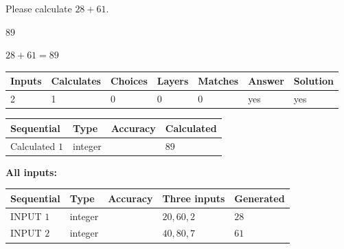 \documentclass[12pt]{article}
\begin{document}
  
 
Please calculate $ %
28 +  %
61 $.
 
 
 
\noindent{}
 
 

89
 
 
\noindent{}
 
 

 
 
 
\noindent{}
 
 

$ %
28 +  %
61=   %
89$
 
 
\noindent{}
 
 

 
   
   
   
   
\noindent\begin{tabular}{|l|l|l|l|l|l|l|}
 \hline
Inputs & Calculates & Choices & Layers & Matches & Answer & Solution \\ \hline
 2  & 
 1  & 
 0
  & 
 0  & 
 0  & 
  yes & 
  yes 
  \\ \hline
 \end{tabular}
   
   
   
   
\noindent{}
   
   
  
  
\noindent\begin{tabular}{|l|l|l|l|}
\hline
 Sequential & Type & Accuracy & Calculated \\ 
\hline
 
 
  Calculated $  1 $ & integer &  & 
  $ 89 $ 
 \\  \hline  
 \end{tabular}
   
   
   
   
\noindent\vspace{0.1in}\hspace{-0.08in} {\textbf{\Large{All inputs: }}}
   
   
  
  
\noindent\begin{tabular}{|l|l|l|l|l|}
\hline
 Sequential & Type & Accuracy & Three inputs & Generated \\ 
\hline
 
 
  INPUT $  1 $ & integer &  & $
 20
 , 
 60
 , 
 2
 $ & $ 28 $ 
 \\  \hline  
 
 
  INPUT $  2 $ & integer &  & $
 40
 , 
 80
 , 
 7
 $ & $ 61 $ 
 \\  \hline  
 \end{tabular}
   
\end{document}
